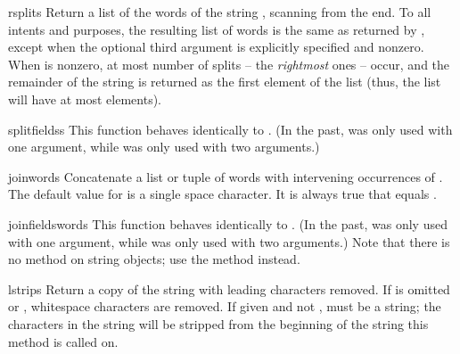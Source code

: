 \begin{funcdesc}{rsplit}{s}
  Return a list of the words of the string , scanning 
  from the end.  To all intents and purposes, the resulting list of
  words is the same as returned by , except when the
  optional third argument  is explicitly specified and
  nonzero.  When  is nonzero, at most 
  number of splits -- the \emph{rightmost} ones -- occur, and the remainder
  of the string is returned as the first element of the list (thus, the
  list will have at most  elements).
\end{funcdesc}

\begin{funcdesc}{splitfields}{s}
  This function behaves identically to .  (In the
  past,  was only used with one argument, while
   was only used with two arguments.)
\end{funcdesc}

\begin{funcdesc}{join}{words}
  Concatenate a list or tuple of words with intervening occurrences of 
  .  The default value for  is a single space
  character.  It is always true that
  equals .
\end{funcdesc}

\begin{funcdesc}{joinfields}{words}
  This function behaves identically to .  (In the past, 
   was only used with one argument, while
   was only used with two arguments.)
  Note that there is no  method on string
  objects; use the  method instead.
\end{funcdesc}

\begin{funcdesc}{lstrip}{s}
Return a copy of the string with leading characters removed.  If
 is omitted or , whitespace characters are
removed.  If given and not ,  must be a string;
the characters in the string will be stripped from the beginning of
the string this method is called on.
\end{funcdesc}


